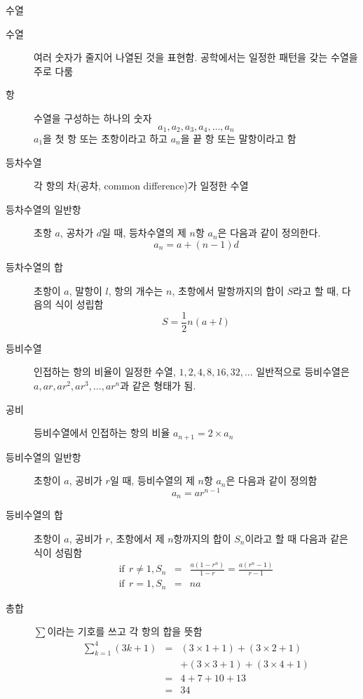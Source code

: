 \documentclass[10pt,t]{beamer}
\begin{document}
\begin{frame}{수열}
  \begin{description}
  \item[수열] 여러 숫자가 줄지어 나열된 것을 표현함. 공학에서는 일정한 패턴을 갖는 수열을 주로 다룸
  \item[항] 수열을 구성하는 하나의 숫자\\ 
    \begin{equation*}
      a_1, a_2, a_3, a_4, \ldots, a_n 
    \end{equation*}
    $a_1$을 첫 항 또는 초항이라고 하고 $a_n$을 끝 항 또는 말항이라고 함
  \item[등차수열] 각 항의 차(공차, common difference)가 일정한 수열
  \item[등차수열의 일반항] 초항 $a$, 공차가 $d$일 때, 등차수열의 제 $n$항 $a_n$은 다음과 같이 정의한다. \\
    \begin{equation*}
      a_n =a + (n-1)d
    \end{equation*}
  \item[등차수열의 합] 초항이 $a$, 말항이 $l$, 항의 개수는 $n$, 초항에서 말항까지의 합이 $S$라고 할 때, 다음의 식이 성립함
    \begin{equation*}
      S = \frac{1}{2}n(a+l)
    \end{equation*}
  \item[등비수열] 인접하는 항의 비율이 일정한 수열, $1, 2, 4, 8, 16, 32, \ldots$ 일반적으로 등비수열은 $a, ar, ar^2, ar^3, \ldots, ar^n$과 같은 형태가 됨. 
  \item[공비] 등비수열에서 인접하는 항의 비율 $a_{n+1} = 2 \times a_n$
  \item[등비수열의 일반항] 초항이 $a$, 공비가 $r$일 때, 등비수열의 제 $n$항 $a_n$은 다음과 같이 정의함\\
    \begin{equation*}
      a_n = ar^{n-1}
    \end{equation*}
  \item[등비수열의 합] 초항이 $a$, 공비가 $r$, 초항에서 제 $n$항까지의 합이 $S_n$이라고 할 때 다음과 같은 식이 성림함
    \begin{eqnarray*}
      \text{if}~~ r\neq 1, S_n& = &\frac{a(1-r^n)}{1-r} = \frac{a(r^n-1)}{r-1} \\
      \text{if}~~ r =1, S_n &=& na
    \end{eqnarray*}
  \item[총합] $\sum$이라는 기호를 쓰고 각 항의 합을 뜻함\\
    \begin{eqnarray*}
      \sum_{k=1}^4 (3k + 1) & = & (3\times 1 + 1) +  (3 \times 2 + 1) \\&&+ (3 \times 3 + 1) + (3 \times 4 + 1) \\
                            & = & 4 + 7 + 10 + 13 \\
      & = & 34
    \end{eqnarray*}\\
    

\end{description}
\end{frame}
\end{document}
